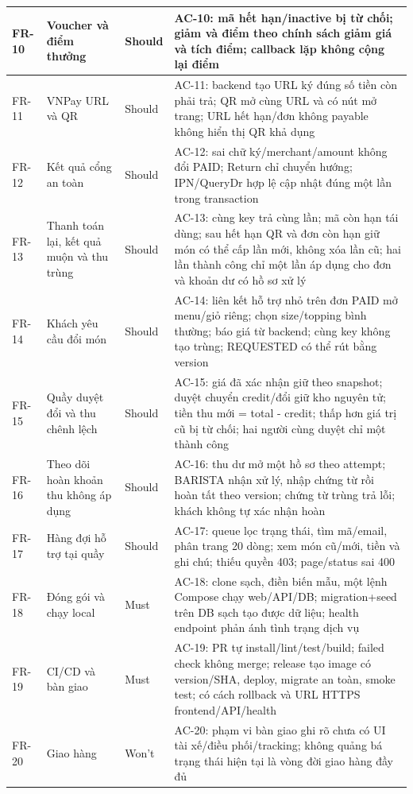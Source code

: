 \begin{longtable}{|>{\raggedright\arraybackslash}p{}|>{\raggedright\arraybackslash}p{}|>{\raggedright\arraybackslash}p{}|>{\raggedright\arraybackslash}p{}|}
FR-10 & Voucher và điểm thưởng & Should & AC-10: mã hết hạn/inactive bị từ chối; giảm và điểm theo chính sách giảm giá và tích điểm; callback lặp không cộng lại điểm \\ \hline
FR-11 & VNPay URL và QR & Should & AC-11: backend tạo URL ký đúng số tiền còn phải trả; QR mở cùng URL và có nút mở trang; URL hết hạn/đơn không payable không hiển thị QR khả dụng \\ \hline
FR-12 & Kết quả cổng an toàn & Should & AC-12: sai chữ ký/merchant/amount không đổi PAID; Return chỉ chuyển hướng; IPN/QueryDr hợp lệ cập nhật đúng một lần trong transaction \\ \hline
FR-13 & Thanh toán lại, kết quả muộn và thu trùng & Should & AC-13: cùng key trả cùng lần; mã còn hạn tái dùng; sau hết hạn QR và đơn còn hạn giữ món có thể cấp lần mới, không xóa lần cũ; hai lần thành công chỉ một lần áp dụng cho đơn và khoản dư có hồ sơ xử lý \\ \hline
FR-14 & Khách yêu cầu đổi món & Should & AC-14: liên kết hỗ trợ nhỏ trên đơn PAID mở menu/giỏ riêng; chọn size/topping bình thường; báo giá từ backend; cùng key không tạo trùng; REQUESTED có thể rút bằng version \\ \hline
FR-15 & Quầy duyệt đổi và thu chênh lệch & Should & AC-15: giá đã xác nhận giữ theo snapshot; duyệt chuyển credit/đổi giữ kho nguyên tử; tiền thu mới = total - credit; thấp hơn giá trị cũ bị từ chối; hai người cùng duyệt chỉ một thành công \\ \hline
FR-16 & Theo dõi hoàn khoản thu không áp dụng & Should & AC-16: thu dư mở một hồ sơ theo attempt; BARISTA nhận xử lý, nhập chứng từ rồi hoàn tất theo version; chứng từ trùng trả lỗi; khách không tự xác nhận hoàn \\ \hline
FR-17 & Hàng đợi hỗ trợ tại quầy & Should & AC-17: queue lọc trạng thái, tìm mã/email, phân trang 20 dòng; xem món cũ/mới, tiền và ghi chú; thiếu quyền 403; page/status sai 400 \\ \hline
FR-18 & Đóng gói và chạy local& Must & AC-18: clone sạch, điền biến mẫu, một lệnh Compose chạy web/API/DB; migration+seed trên DB sạch tạo được dữ liệu; health endpoint phản ánh tình trạng dịch vụ \\ \hline
FR-19 & CI/CD và bàn giao& Must & AC-19: PR tự install/lint/test/build; failed check không merge; release tạo image có version/SHA, deploy, migrate an toàn, smoke test; có cách rollback và URL HTTPS frontend/API/health \\ \hline
FR-20 & Giao hàng & Won't & AC-20: phạm vi bàn giao ghi rõ chưa có UI tài xế/điều phối/tracking; không quảng bá trạng thái hiện tại là vòng đời giao hàng đầy đủ \\ \hline
\end{longtable}
\endgroup
